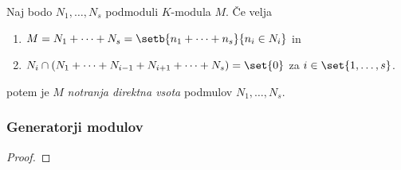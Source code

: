 Naj bodo $N_1, \dots, N_s$ podmoduli $K$-modula $M$. Če velja 
\begin{enumerate}
    \item $M = N_1 + \dots + N_s = \setb{n_1 + \dots + n_s}{n_i \in N_i}$ in
    \item $N_i \cap (N_1 +  \dots + N_{i-1} + N_{i+1} + \dots + N_s) = \set{0}$ za 
    $i \in \set{1, \dots, s}$.
\end{enumerate}
potem je $M$ \emph{notranja direktna vsota} podmulov $N_1, \dots, N_s$.

\begin{trditev}
    
\end{trditev}

\begin{definicija}
    
\end{definicija}

\begin{primer}
    
\end{primer}


\subsubsection*{Generatorji modulov}

\begin{definicija}
    
\end{definicija}

\begin{primer}
    
\end{primer}

\begin{definicija}
    
\end{definicija}

\begin{lema}
    
\end{lema}

\begin{proof}
    
\end{proof}

\begin{definicija}
    
\end{definicija}


